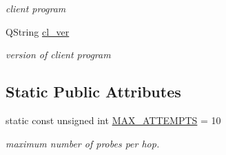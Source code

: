 \begin{CompactItemize}
\begin{CompactList}\small\item\em client program \item\end{CompactList}\item 
\hypertarget{classTraceroute_eb41c57b923b49f6dadeab291c2a8987}{
QString \hyperlink{classTraceroute_eb41c57b923b49f6dadeab291c2a8987}{cl\_\-ver}}
\label{classTraceroute_eb41c57b923b49f6dadeab291c2a8987}

\begin{CompactList}\small\item\em version of client program \item\end{CompactList}\end{CompactItemize}
\subsection*{Static Public Attributes}
\begin{CompactItemize}
\item 
static const unsigned int \hyperlink{classTraceroute_4abb97c003bb8f524a8a1f2297762126}{MAX\_\-ATTEMPTS} = 10
\begin{CompactList}\small\item\em maximum number of probes per hop. \item\end{CompactList}\end{CompactItemize}
